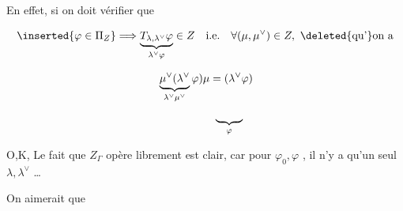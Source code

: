 En effet, si  on doit vérifier  que

\[
\inserted{\varphi\in\Pi_Z}\Longrightarrow\underbrace{T_{\lambda,\lambda^\vee}\varphi}_{\lambda^\vee\varphi}\in Z\quad\text{i.e.}\quad
\forall(\mu,\mu^\vee)\in Z,\ \deleted{\text{qu'}}\text{on a}
\]

\[
\begin{aligned}
&\underbrace{\mu^\vee(\lambda^\vee}_{\lambda^\vee\mu^\vee}\varphi)\mu=(\lambda^\vee\varphi)\\
&\hspace{18mm}\underbrace{\phantom{\mu^\vee\varphi\mu}}_{\varphi}
\end{aligned}
\]

O,K, Le fait que $Z_\Gamma$ opère librement est clair,  car pour $\varphi_0,\varphi$ , il n'y a qu'un seul $\lambda,\lambda^\vee$ \ldots

  On aimerait que

